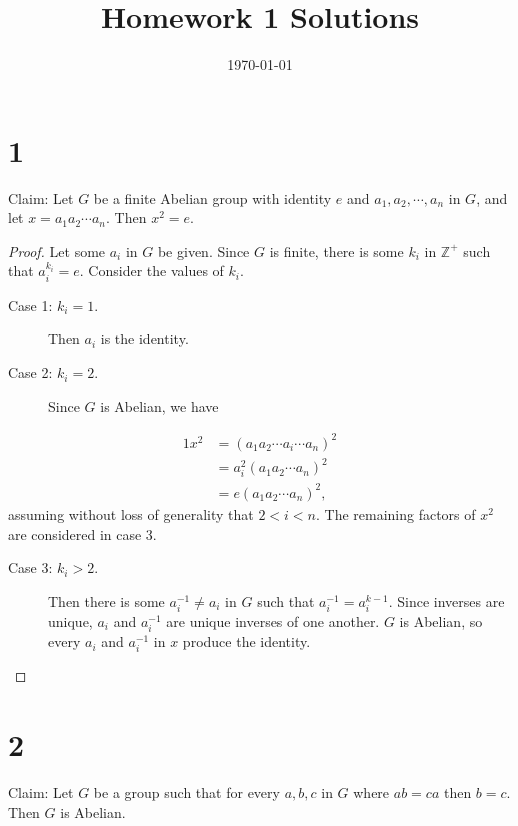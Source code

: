 \documentclass{article}
\title{\textbf{Homework 1 Solutions}}
\date{}
\date\today
\begin{document}
\maketitle %

\thispagestyle{firstpage}
\section*{1}

Claim: Let $G$ be a finite Abelian group with identity $e$ and $a_1, a_2, \cdots, a_n$ in $G$, and let 
$x = a_1 a_2 \cdots a_n$.  Then $x^2 = e$.

\begin{proof}
    Let some $a_i$ in $G$ be given.  Since $G$ is finite, there is some $k_i$ in $\mathbb{Z}^+$
    such that $a_i^{k_i} = e$.  Consider the values of $k_i$.
    \begin{description}
        \item[Case 1: $k_i = 1$.]  Then $a_i$ is the identity.
        \item[Case 2: $k_i = 2$.]  Since $G$ is Abelian, we have
    \end{description}
    \begin{alignat*}{1}
        x^2 &= (a_1 a_2 \cdots a_i \cdots a_n)^2 \\
        &= a_i^2(a_1 a_2 \cdots a_n)^2 \\
        &= e(a_1 a_2 \cdots a_n)^2,
    \end{alignat*}
    assuming without loss of generality that $2 < i < n$.  
    The remaining factors of $x^2$ are considered in case 3.
    \begin{description}
        \item[Case 3: $k_i > 2$.]  Then there is some $a_i^{-1} \neq a_i$ in $G$ such that 
        $a_i^{-1} = a_i^{k-1}$.  Since inverses are unique, $a_i$ and 
        $a_i^{-1}$ are unique inverses of one another.  $G$ is Abelian, so 
        every $a_i$ and $a_i^{-1}$ in $x$ produce the identity.
    \end{description}
\end{proof}

\section*{2}

Claim: Let $G$ be a group such that for every $a, b, c$ in $G$ where $ab=ca$ then 
$b=c$.  Then $G$ is Abelian.
\end{document}
